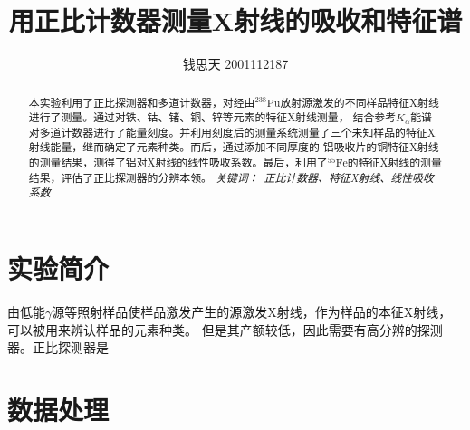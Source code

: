 \documentclass{article}
\title{用正比计数器测量X射线的吸收和特征谱}
\author{钱思天 2001112187}
\begin{document}
    \maketitle
    \begin{abstract}
        本实验利用了正比探测器和多道计数器，对经由$^{238}\text{Pu}$放射源激发的不同样品特征X射线进行了测量。通过对铁、钴、锗、铜、锌等元素的特征X射线测量，
        结合参考$K_\alpha$能谱对多道计数器进行了能量刻度。并利用刻度后的测量系统测量了三个未知样品的特征X射线能量，继而确定了元素种类。而后，通过添加不同厚度的
        铝吸收片的铜特征X射线的测量结果，测得了铝对X射线的线性吸收系数。最后，利用了$^{55}\text{Fe}$的特征X射线的测量结果，评估了正比探测器的分辨本领。
        \newline
        \newline
        {\emph{ 关键词：\ 正比计数器、特征X射线、线性吸收系数 }\rm}

    \end{abstract}

    \section{实验简介}
    由低能$\gamma$源等照射样品使样品激发产生的源激发X射线，作为样品的本征X射线，可以被用来辨认样品的元素种类。
        但是其产额较低，因此需要有高分辨的探测器。正比探测器是
    \section{数据处理}
\end{document}
